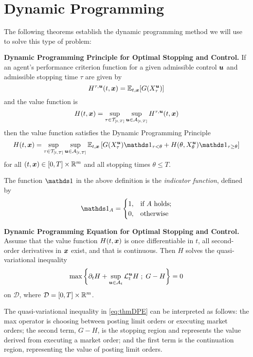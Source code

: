 \section{Dynamic Programming}
The following theorems establish the dynamic programming method we will use to solve this type of problem:
\begin{thm}{\bf Dynamic Programming Principle for Optimal Stopping and Control.} \citep{STA4505} If an agent's performance criterion function for a given admissible control $\bm{u}$ and admissible stopping time $\tau$ are given by
\[ H^{\tau, \bm{u}}(t,\bm{x}) = \mathbb{E}_{t,\bm{x}} [ G (X^{\bm{u}}_\tau)] \]
and the value function is
\[ H(t,\bm{x}) = \sup\limits_{\tau \in \mathcal{T}_{[t,T]}} \sup\limits_{\bm{u} \in \mathcal{A}_{[t,T]}} H^{\tau, \bm{u}}(t,\bm{x}) \]
then the value function satisfies the Dynamic Programming Principle
\begin{equation}\label{eq:thmDPP}
H(t,\bx) = \sup\limits_{\tau \in \mathcal{T}_{[t,T]}} \sup\limits_{\bu \in \cA_{[t,T]}} \E_{t,\bx} \left[ G (X^{\bu}_\tau) \indicator_{\tau<\theta} + H(\theta, X^{\bu}_\theta)\indicator_{\tau \geq \theta} \right]
\end{equation}
for all $(t,\bm{x}) \in [0,T] \times \mathbb{R}^m$ and all stopping times $\theta \leq T$.
\end{thm}
The function $\indicator$ in the above definition is the \emph{indicator function}, defined by
\begin{equation}
\indicator_A = \begin{cases} 1, & \text{if $A$ holds;} \\ 0, & \text{otherwise} \end{cases}
\end{equation}
\begin{thm}{\bf Dynamic Programming Equation for Optimal Stopping and Control.} \citep{STA4505} Assume that the value function $H(t,\bm{x})$ is once differentiable in $t$, all second-order derivatives in $\bm{x}$ exist, and that  is continuous. Then $H$ solves the quasi-variational inequality
\begin{equation}\label{eq:thmDPE}
\max \left\lbrace \partial_t H + \sup \limits_{\bm{u} \in \mathcal{A}_t} \mathcal{L}^{\bm{u}}_t H \; ; \; G - H \right\rbrace = 0
\end{equation}
on $\mathcal{D}$, where $\mathcal{D} = [0,T] \times \mathbb{R}^m$.
\end{thm}
The quasi-variational inequality in \autoref{eq:thmDPE} can be interpreted as follows: the max operator is choosing between posting limit orders or executing market orders; the second term, $G-H$, is the stopping region and represents the value derived from executing a market order; and the first term is the continuation region, representing the value of posting limit orders.

